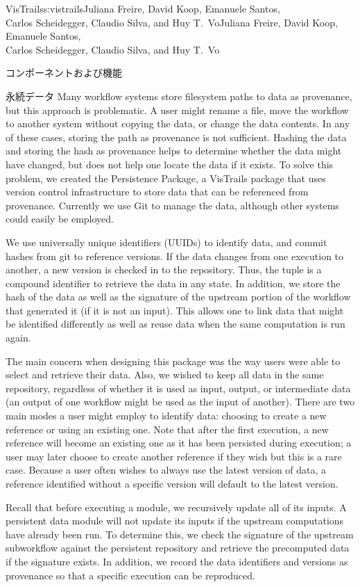 \begin{aosachaptertoc}{VisTrails}{s:vistrails}{Juliana Freire, David Koop, Emanuele Santos, \\ Carlos Scheidegger, Claudio Silva, and Huy T.\ Vo}{Juliana Freire, David Koop, Emanuele Santos, \\ \hspace*{0.9cm} Carlos Scheidegger, Claudio Silva, and Huy T.\ Vo}
\begin{aosasect1}{コンポーネントおよび機能}
\begin{aosasect2}{永続データ}
Many workflow systems store filesystem paths to data as provenance,
but this approach is problematic.  A user might rename a file, move
the workflow to another system without copying the data, or change the
data contents.  In any of these cases, storing the path as provenance
is not sufficient.  Hashing the data and storing
the hash as provenance helps to determine whether the data might have
changed, but does not help one locate the data if it exists.  To solve
this problem, we created the Persistence Package, a VisTrails package
that uses version control infrastructure to store data that can be
referenced from provenance.  Currently we use Git to manage the data,
although other systems could easily be employed.

We use universally unique identifiers (UUIDs) to identify data, and
commit hashes from git to reference versions.  If the data changes
from one execution to another, a new version is checked in to the
repository.  Thus, the  tuple is a compound identifier
to retrieve the data in any state.  In addition, we store the hash of
the data as well as the signature of the upstream portion of the
workflow that generated it (if it is not an input).  This allows one
to link data that might be identified differently as well as reuse
data when the same computation is run again.

The main concern when designing this package was the way users were
able to select and retrieve their data.  Also, we wished to keep all
data in the same repository, regardless of whether it is used as
input, output, or intermediate data (an output of one workflow might
be used as the input of another).  There are two main modes a user
might employ to identify data: choosing to create a new reference or
using an existing one.  Note that after the first execution, a new
reference will become an existing one as it has been persisted during
execution; a user may later choose to create another reference if
they wish but this is a rare case.  Because a user often wishes to
always use the latest version of data, a reference identified without
a specific version will default to the latest version.

Recall that before executing a module, we recursively update all of
its inputs.  A persistent data module will not update its inputs if
the upstream computations have already been run.  To determine this,
we check the signature of the upstream subworkflow against the
persistent repository and retrieve the precomputed data if the
signature exists.  In addition, we record the data identifiers and
versions as provenance so that a specific execution can be reproduced.


\end{aosasect2}
\end{aosasect1}
\end{aosachaptertoc}
